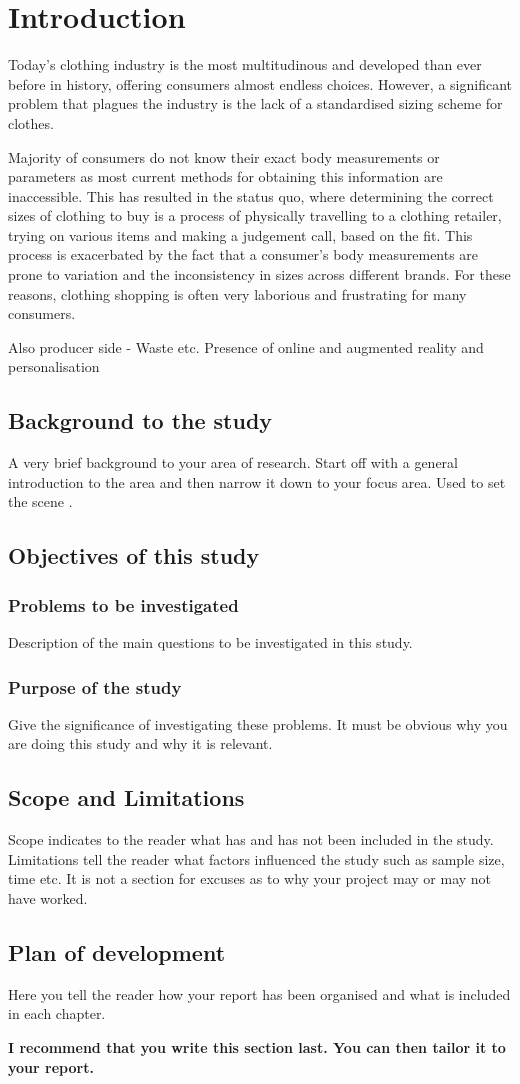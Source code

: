 \chapter{Introduction}

Today's clothing industry is the most multitudinous and developed than ever before in history, offering consumers almost endless choices. However, a significant problem that plagues the industry is the lack of a standardised sizing scheme for clothes. 

Majority of consumers do not know their exact body measurements or parameters as most current methods for obtaining this information are inaccessible. This has resulted in the status quo, where determining the correct sizes of clothing to buy is a process of physically travelling to a clothing retailer, trying on various items and making a judgement call, based on the fit. This process is exacerbated by the fact that a consumer's body measurements are prone to variation and the inconsistency in sizes across different brands. For these reasons, clothing shopping is often very laborious and frustrating for many consumers.

Also producer side - Waste etc.
Presence of online and augmented reality and personalisation

\section{Background to the study}
A very brief background to your area of research. Start off with a general introduction to the area and
then narrow it down to your focus area. Used to set the scene \cite{smt2011}.
\section{Objectives of this study}
\subsection{Problems to be investigated}
Description of the main questions to be investigated in this study.
\subsection{Purpose of the study}
Give the significance of investigating these problems. It must be obvious why you are doing this study
and why it is relevant.

\section{Scope and Limitations}
Scope indicates to the reader what has and has not been included in the study. Limitations tell the
reader what factors influenced the study such as sample size, time etc. It is not a section for excuses as
to why your project may or may not have worked.

\section{Plan of development}
Here you tell the reader how your report has been organised and what is included in each
chapter.

{\bf I recommend that you write this section last. You can then tailor it to your report.}


